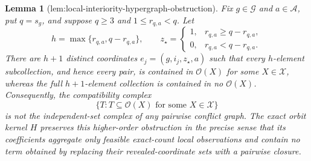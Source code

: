 \documentclass{article}
\newtheorem{lemma}{Lemma}
\begin{document}
\begin{lemma}[lem:local-interiority-hypergraph-obstruction]\label{lem:local-interiority-hypergraph-obstruction}
Fix \(g\in\mathcal G\) and \(a\in\mathcal A\), put \(q=s_g\), and suppose \(q\ge 3\) and \(1\le r_{q,a}<q\).  Let
\[
 h=\max\{r_{q,a},q-r_{q,a}\},
 \qquad
 z_\star=\begin{cases}
 1,&r_{q,a}\ge q-r_{q,a},\\
 0,&r_{q,a}<q-r_{q,a}.
 \end{cases}
\]
There are \(h+1\) distinct coordinates \(e_j=(g,i_j,z_\star,a)\) such that every \(h\)-element subcollection, and hence every pair, is contained in \(\mathcal O(X)\) for some \(X\in\mathcal X\), whereas the full \(h+1\)-element collection is contained in no \(\mathcal O(X)\).  Consequently, the compatibility complex
\[
 \bigl\{T:T\subseteq\mathcal O(X)\text{ for some }X\in\mathcal X\bigr\}
\]
is not the independent-set complex of any pairwise conflict graph.  The exact orbit kernel \(H\) preserves this higher-order obstruction in the precise sense that its coefficients aggregate only feasible exact-count local observations and contain no term obtained by replacing their revealed-coordinate sets with a pairwise closure.
\end{lemma}
\end{document}
